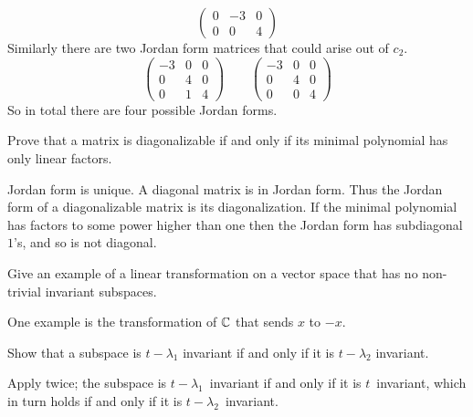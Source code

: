 \begin{exercises}
\begin{answer}
\begin{equation*}
\begin{pmatrix}
           0  &-3 &0  \\
           0  &0  &4
        \end{pmatrix}
      \end{equation*}
      Similarly there are two Jordan form matrices that could arise
      out of $c_2$.
      \begin{equation*}
        \begin{pmatrix}
          -3  &0  &0  \\
           0  &4  &0  \\
           0  &1  &4
        \end{pmatrix}
        \qquad
        \begin{pmatrix}
          -3  &0  &0  \\
           0  &4  &0  \\
           0  &0  &4
        \end{pmatrix}
     \end{equation*}  
     So in total there are four possible Jordan forms.
    \end{answer}
  \recommended \item
    Prove that a matrix is diagonalizable if and only if its minimal
    polynomial has only linear factors.
    \begin{answer}
       Jordan form is unique.
       A diagonal matrix is in Jordan form.
       Thus the Jordan form of a diagonalizable matrix is its diagonalization.
       If the minimal polynomial has factors to some power higher than one
       then the Jordan form has subdiagonal \( 1 \)'s, and so is not
       diagonal.  
     \end{answer}
  \item 
    Give an example of a linear transformation on a vector
    space that has no non-trivial invariant subspaces.
    \begin{answer}
      One example is the transformation of \( \mathbb{C} \) that
       sends \( x \) to \( -x \).  
     \end{answer}
  \item 
    Show that a subspace is \( t-\lambda_1 \) invariant if and only if
    it is \( t-\lambda_2 \) invariant.
    \begin{answer}
      Apply  twice;
      the subspace is $t-\lambda_1$~invariant if and only if it is 
      $t$~invariant, which in turn holds if and only if it is 
      $t-\lambda_2$~invariant.  
    \end{answer}
  \item 

\end{exercises}
